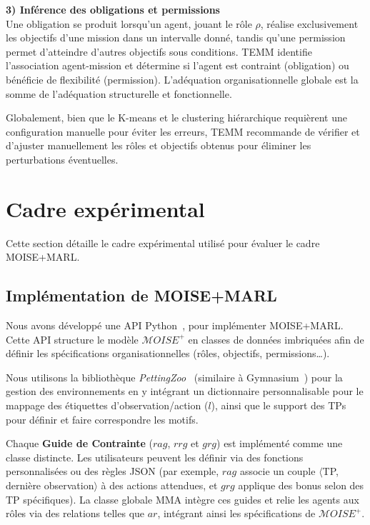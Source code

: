 \documentclass[dissemination]{jfsma}
\begin{document}
\noindent\textbf{3) Inférence des obligations et permissions} \\
Une obligation se produit lorsqu'un agent, jouant le rôle \(\rho\), réalise exclusivement les objectifs d'une mission dans un intervalle donné, tandis qu'une permission permet d'atteindre d'autres objectifs sous conditions. TEMM identifie l'association agent-mission et détermine si l'agent est contraint (obligation) ou bénéficie de flexibilité (permission). L'adéquation organisationnelle globale est la somme de l'adéquation structurelle et fonctionnelle.

Globalement, bien que le K-means et le clustering hiérarchique requièrent une configuration manuelle pour éviter les erreurs, TEMM recommande de vérifier et d'ajuster manuellement les rôles et objectifs obtenus pour éliminer les perturbations éventuelles.


\section{Cadre expérimental}
\label{sec:experimental_setup}

Cette section détaille le cadre expérimental utilisé pour évaluer le cadre MOISE+MARL.

\subsection{Implémentation de MOISE+MARL}

Nous avons développé une API Python~\hyperref[fn:github]{\footnotemark[2]}, pour implémenter MOISE+MARL. Cette API structure le modèle \(\mathcal{M}OISE^+\) en classes de données imbriquées afin de définir les spécifications organisationnelles (rôles, objectifs, permissions\dots).

Nous utilisons la bibliothèque \textit{PettingZoo}~\cite{terry2020pettingzoo} (similaire à Gymnasium~\cite{kwiatkowski2024}) pour la gestion des environnements en y intégrant un dictionnaire personnalisable pour le mappage des étiquettes d'observation/action (\(l\)), ainsi que le support des TPs pour définir et faire correspondre les motifs.

Chaque \textbf{Guide de Contrainte} (\(rag\), \(rrg\) et \(grg\)) est implémenté comme une classe distincte. Les utilisateurs peuvent les définir via des fonctions personnalisées ou des règles JSON (par exemple, \(rag\) associe un couple \(\langle\)TP, dernière observation\(\rangle\) à des actions attendues, et \(grg\) applique des bonus selon des TP spécifiques). La classe globale MMA intègre ces guides et relie les agents aux rôles via des relations telles que \(ar\), intégrant ainsi les spécifications de \(\mathcal{M}OISE^+\).
\end{document}
